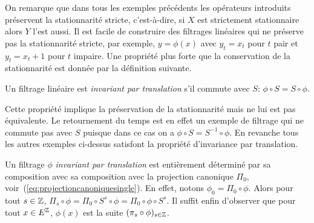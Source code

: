 On remarque que dans tous les exemples pr\'ec\'edents les op\'erateurs introduits
pr\'eservent la stationnarit\'e stricte,
c'est-\`a-dire, si $X$ est strictement stationnaire alors $Y$ l'est
aussi. Il est facile de construire des
filtrages lin\'eaires qui ne pr\'eserve pas la stationnarit\'e stricte, par exemple,
$y=\phi(x)$ avec $y_t=x_t$ pour $t$ pair et $y_t=x_t+1$ pour $t$ impaire. Une propri\'et\'e plus
forte que la conservation de la stationnarit\'e est donn\'ee par la d\'efinition
suivante.

\begin{definition}
  Un filtrage lin\'eaire est \emph{invariant par translation} s'il commute avec
  $S$: $\phi\circ S=S\circ \phi$.
\end{definition}

Cette propri\'et\'e implique la pr\'eservation de la stationnarit\'e mais ne lui est
pas \'equivalente. Le retournement du temps est en effet un exemple de filtrage
qui ne commute pas avec $S$ puisque dans ce cas on a $\phi\circ S=S^{-1}\circ
\phi$.  En revanche tous les autres exemples ci-dessus satisfont la propri\'et\'e
d'invariance par translation.

\begin{remark}
\label{rem:FiltrageInvTrans}
Un filtrage $\phi$ \emph{invariant par translation} est enti\`erement
d\'etermin\'e par sa composition avec sa composition avec la projection canonique
$\Pi_0$,
voir~(\ref{eq:projectioncanoniquesingle}). En effet, notons
$\phi_0=\Pi_0\circ\phi$. Alors pour tout $s\in \mathbb{Z}$, $\Pi_s\circ\phi=
\Pi_0\circ S^{s}\circ\phi=\Pi_0\circ\phi\circ S^{s}$. Il suffit enfin
d'observer que pour tout $x\in E^{\mathbb{Z}}$, $\phi(x)$ est la suite
$(\pi_s\circ\phi)_{s\in \mathbb{Z}}$.
\end{remark}










